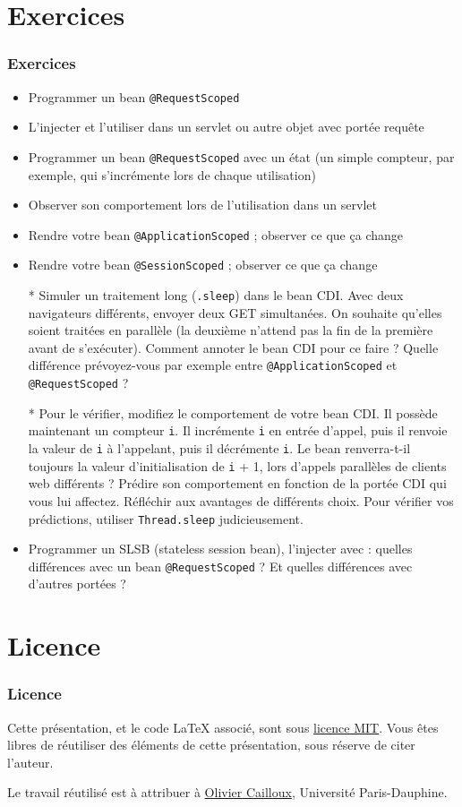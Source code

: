 \documentclass[english, french]{beamer}
\begin{document}
\section{Exercices}
\begin{frame}[allowframebreaks]
	\frametitle{Exercices}
	\begin{itemize}
		\item Programmer un bean \texttt{@RequestScoped}
		\item L’injecter et l’utiliser dans un servlet {\tiny ou autre objet avec portée requête}
		\item Programmer un bean \texttt{@RequestScoped} avec un état (un simple compteur, par exemple, qui s’incrémente lors de chaque utilisation)
		\item Observer son comportement lors de l’utilisation dans un servlet
		\item Rendre votre bean \texttt{@ApplicationScoped} ; observer ce que ça change
		\item Rendre votre bean \texttt{@SessionScoped} ; observer ce que ça change
		\item[*] Simuler un traitement long (\texttt{.sleep}) dans le bean CDI. Avec deux navigateurs différents, envoyer deux GET simultanées. On souhaite qu’elles soient traitées en parallèle (la deuxième n’attend pas la fin de la première avant de s’exécuter). Comment annoter le bean CDI pour ce faire ? Quelle différence prévoyez-vous par exemple entre \texttt{@ApplicationScoped} et \texttt{@RequestScoped} ?
		\item[*] Pour le vérifier, modifiez le comportement de votre bean CDI. Il possède maintenant un compteur \texttt{i}. Il incrémente \texttt{i} en entrée d’appel, puis il renvoie la valeur de \texttt{i} à l’appelant, puis il décrémente \texttt{i}. Le bean renverra-t-il toujours la valeur d’initialisation de \texttt{i} + 1, lors d’appels parallèles de clients web différents ? Prédire son comportement en fonction de la portée CDI qui vous lui affectez. Réfléchir aux avantages de différents choix. Pour vérifier vos prédictions, utiliser \texttt{Thread.sleep} judicieusement.
		\item Programmer un SLSB (stateless session bean), l’injecter avec  : quelles différences avec un bean \texttt{@RequestScoped} ? Et quelles différences avec d’autres portées ?
	\end{itemize}
\end{frame}

\appendix
\section{Licence}
\begin{frame}
	\frametitle{Licence}
	Cette présentation, et le code LaTeX associé, sont sous \href{http://opensource.org/licenses/MIT}{licence MIT}. Vous êtes libres de réutiliser des éléments de cette présentation, sous réserve de citer l’auteur.
	
	Le travail réutilisé est à attribuer à \href{http://www.lamsade.dauphine.fr/~ocailloux/}{Olivier Cailloux}, Université Paris-Dauphine.
\end{frame}
\end{document}
